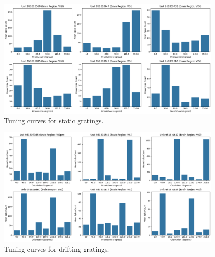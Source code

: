 \documentclass[10pt,twocolumn]{article}
\begin{document}
\begin{figure}[H]
\centering
\includegraphics[width=\linewidth]{report_images/static_tuning_curves.png}
\caption{Tuning curves for static gratings.}
\label{fig:static_tuning}
\end{figure}

\begin{figure}[H]
\centering
\includegraphics[width=\linewidth]{report_images/Drifting_tuning_curves.png}
\caption{Tuning curves for drifting gratings.}
\label{fig:drifting_tuning}
\end{figure}
\end{document}
